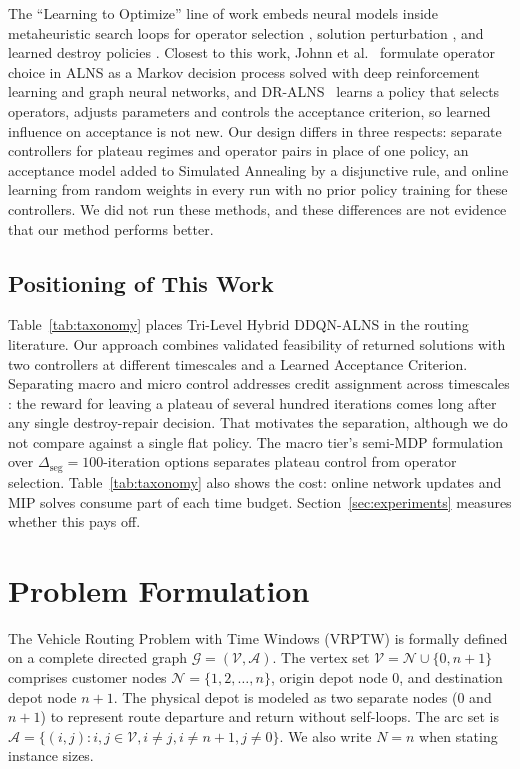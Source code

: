 \documentclass{ieeeaccess}
\begin{document}
The ``Learning to Optimize'' line of work \cite{bengio2021machine} embeds neural models inside metaheuristic search loops for operator selection \cite{kallestad2023general, lu2020learning}, solution perturbation \cite{chen2019learning}, and learned destroy policies \cite{hottung2020neural}. Closest to this work, Johnn et al.~\cite{johnn2023graph} formulate operator choice in ALNS as a Markov decision process solved with deep reinforcement learning and graph neural networks, and DR-ALNS~\cite{reijnen2024online} learns a policy that selects operators, adjusts parameters and controls the acceptance criterion, so learned influence on acceptance is not new. Our design differs in three respects: separate controllers for plateau regimes and operator pairs in place of one policy, an acceptance model added to Simulated Annealing by a disjunctive rule, and online learning from random weights in every run with no prior policy training for these controllers. We did not run these methods, and these differences are not evidence that our method performs better.

\subsection{Positioning of This Work}
\label{sec:rw_positioning}

Table~\ref{tab:taxonomy} places Tri-Level Hybrid DDQN-ALNS in the routing literature. Our approach combines validated feasibility of returned solutions with two controllers at different timescales and a Learned Acceptance Criterion. Separating macro and micro control addresses credit assignment across timescales \cite{sutton1999between}: the reward for leaving a plateau of several hundred iterations comes long after any single destroy-repair decision. That motivates the separation, although we do not compare against a single flat policy. The macro tier's semi-MDP formulation over $\Delta_{\text{seg}}=100$-iteration options separates plateau control from operator selection. Table~\ref{tab:taxonomy} also shows the cost: online network updates and MIP solves consume part of each time budget. Section~\ref{sec:experiments} measures whether this pays off.

\section{Problem Formulation}
\label{sec:formulation}

The Vehicle Routing Problem with Time Windows (VRPTW) is formally defined on a complete directed graph $\mathcal{G} = (\mathcal{V}, \mathcal{A})$. The vertex set $\mathcal{V} = \mathcal{N} \cup \{0, n+1\}$ comprises customer nodes $\mathcal{N} = \{1, 2, \dots, n\}$, origin depot node $0$, and destination depot node $n+1$. The physical depot is modeled as two separate nodes ($0$ and $n+1$) to represent route departure and return without self-loops. The arc set is $\mathcal{A} = \{(i, j) : i, j \in \mathcal{V}, i \neq j, i \neq n+1, j \neq 0\}$. We also write $N = n$ when stating instance sizes.
\end{document}
